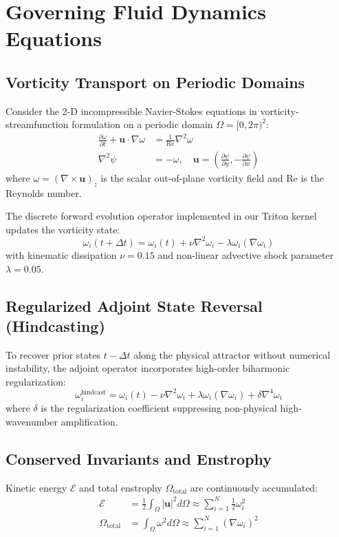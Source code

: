 \documentclass[10pt,twocolumn]{article}
\begin{document}
\section{Governing Fluid Dynamics Equations}

\subsection{Vorticity Transport on Periodic Domains}
Consider the 2-D incompressible Navier-Stokes equations in vorticity-streamfunction formulation on a periodic domain $\Omega = [0, 2\pi)^2$:
\begin{align}
\frac{\partial \omega}{\partial t} + \mathbf{u} \cdot \nabla \omega &= \frac{1}{\text{Re}} \nabla^2 \omega \\
\nabla^2 \psi &= -\omega, \quad \mathbf{u} = \left(\frac{\partial \psi}{\partial y}, -\frac{\partial \psi}{\partial x}\right)
\end{align}
where $\omega = (\nabla \times \mathbf{u})_z$ is the scalar out-of-plane vorticity field and $\text{Re}$ is the Reynolds number.

The discrete forward evolution operator implemented in our Triton kernel updates the vorticity state:
\begin{equation}
\omega_i(t+\Delta t) = \omega_i(t) + \nu \nabla^2 \omega_i - \lambda \omega_i (\nabla \omega_i)
\end{equation}
with kinematic dissipation $\nu = 0.15$ and non-linear advective shock parameter $\lambda = 0.05$.

\subsection{Regularized Adjoint State Reversal (Hindcasting)}
To recover prior states $t - \Delta t$ along the physical attractor without numerical instability, the adjoint operator incorporates high-order biharmonic regularization:
\begin{equation}
\omega_i^{\text{hindcast}} = \omega_i(t) - \nu \nabla^2 \omega_i + \lambda \omega_i (\nabla \omega_i) + \delta \nabla^4 \omega_i
\end{equation}
where $\delta$ is the regularization coefficient suppressing non-physical high-wavenumber amplification.

\subsection{Conserved Invariants and Enstrophy}
Kinetic energy $\mathcal{E}$ and total enstrophy $\Omega_{\text{total}}$ are continuously accumulated:
\begin{align}
\mathcal{E} &= \frac{1}{2} \int_\Omega |\mathbf{u}|^2 d\Omega \approx \sum_{i=1}^N \frac{1}{2} \omega_i^2 \\
\Omega_{\text{total}} &= \int_\Omega \omega^2 d\Omega \approx \sum_{i=1}^N (\nabla \omega_i)^2
\end{align}
\end{document}
